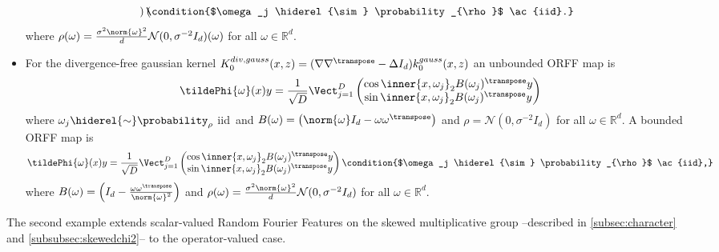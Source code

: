 \begin{itemize}
\begin{dmath*}
\begin{pmatrix}
        \end{pmatrix}
        \condition{$\omega_j \hiderel{\sim} \probability_{\rho}$ \ac{iid}.}
    \end{dmath*}
    where $\rho(\omega) = \frac{\sigma^2\norm{\omega}^2}{d} \mathcal{N}(0,
    \sigma^{-2} I_d)(\omega)$ for all $\omega\in\mathbb{R}^d$.
    \item For the divergence-free gaussian kernel
    $K_0^{div,gauss}(x,z)=(\nabla\nabla^\transpose -\Delta I_d)
    k_0^{gauss}(x,z)$ an unbounded \acs{ORFF} map is
    \begin{dmath}
        \label{eq:unbounded_div_free_orff}
        \tildePhi{\omega}(x) y
        =\frac{1}{\sqrt{D}}\Vect_{j=1}^D
        \begin{pmatrix}
            \cos{\inner{x,\omega_j}_2}B(\omega_j)^\transpose y \\
            \sin{\inner{x,\omega_j}_2}B(\omega_j)^\transpose y
        \end{pmatrix}
    \end{dmath}
    where $\omega_j \hiderel{\sim} \probability_{\rho}$ \ac{iid}~and
    $B(\omega)=\left(\norm{\omega}I_d-\omega\omega^\transpose \right)$ and
    $\rho=\mathcal{N}(0,\sigma^{-2}I_d)$ for all $\omega\in\mathbb{R}^d$. A
    bounded \acs{ORFF} map is
    \begin{dmath*}
        \tildePhi{\omega}(x) y=\frac{1}{\sqrt{D}}\Vect_{j=1}^D
        \begin{pmatrix}
            \cos{\inner{x,\omega_j}_2}B(\omega_j)^\transpose y \\
            \sin{\inner{x,\omega_j}_2}B(\omega_j)^\transpose y
            \end{pmatrix}
            \condition{$\omega_j \hiderel{\sim} \probability_{\rho}$ \ac{iid},}
    \end{dmath*}
    where $B(\omega) = \left(I_d - \frac{\omega\omega^\transpose
    }{\norm{\omega}^2}\right)$ and $\rho(\omega) =
    \frac{\sigma^2\norm{\omega}^2}{d}\mathcal{N}(0,\sigma^{-2}I_d)$ for all
    $\omega\in\mathbb{R}^d$.
\end{itemize}
The second example extends scalar-valued Random Fourier Features on the skewed
multiplicative group --described in \cref{subsec:character} and
\cref{subsubsec:skewedchi2}-- to the operator-valued case.
